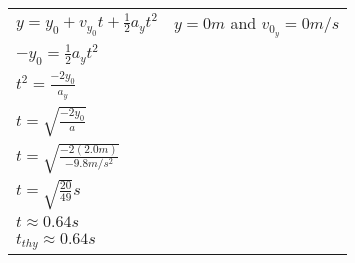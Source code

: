 \documentclass[11pt, letterpaper, includehead]{article}
\renewcommand{\arraystretch}{1.2}
\begin{document}
  \vspace{0.25cm}

  \renewcommand{\arraystretch}{1.75}
  \begin{tabular}{ m{4cm}  l } 
    $y = y_0 + v_{y_0}t + \frac{1}{2}a_yt^2$ & $y = 0m$ and $v_{0_y} = 0m/s$  \\
    $-y_0 = \frac{1}{2}a_yt^2$\\
    $t^2 = \frac{-2y_0}{a_y}$\\
    $t = \sqrt{\frac{-2y_0}{a}}$\\
    $t = \sqrt{\frac{-2(2.0m)}{-9.8m/s^2}}$\\
    $t = \sqrt{\frac{20}{49}}s$\\
    $t \approx 0.64s$\\
    $t_{thy}\approx 0.64s$
  \end{tabular} 

  \renewcommand{\arraystretch}{1.2}
\end{document}
